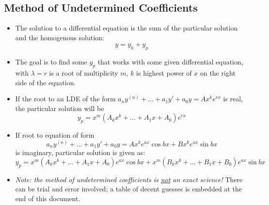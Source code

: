 \documentclass[10pt,letterpaper]{article}
\begin{document}
\subsection*{Method of Undetermined Coefficients}
\begin{itemize}
\item The solution to a differential equation is the sum of the particular solution and the homogenous solution: 
$$ y= y_h+y_p$$

\item The goal is to find some $y_p$ that works with some given differential equation, with $\lambda = r$ is a root of multiplicity $m$, $k$ is highest power of $x$ on the right side of the equation. 

\item If the root to an LDE of the form $a_ny^{(n)}+...+a_1y'+a_0y=Ax^ke^{rx}$ is real, the particular solution will be 
$$y_p=x^m(A_kx^k+...+A_1x+A_0)e^{rx}$$

\item If root to equation of form 
$$ a_ny^{(n)}+...+a_1y'+a_0y=Ax^ke^{ax}\cos bx+Bx^ke^{ax}\sin bx $$
is imaginary, particular solution is given as: 
$$ y_p = x^m(A_kx^k+...+A_1x+A_0)e^{ax}\cos bx + x^m(B_kx^k+...+B_1x+B_0)e^{ax}\sin bx $$

\item \textit{Note: the method of undetermined coefficients is \underline{not} an exact science!} There can be trial and error involved; a table of decent guesses is embedded at the end of this document. 

\end{itemize}
\end{document}
